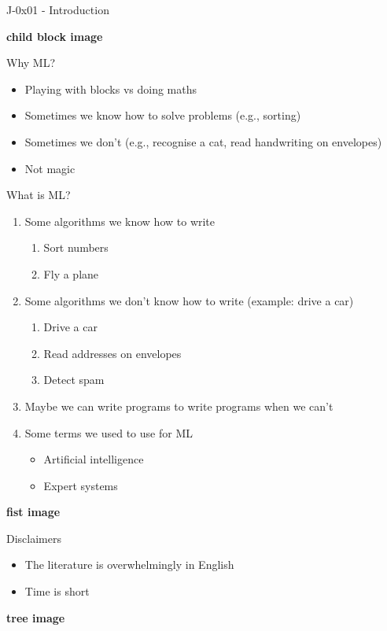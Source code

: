 \documentclass{article}
\begin{document}
\centerline{\Large J-0x01 - Introduction}
\vspace{5mm}

\textbf{child block image}

Why ML?
\begin{itemize}
\item Playing with blocks vs doing maths
\item Sometimes we know how to solve problems (e.g., sorting)
\item Sometimes we don't (e.g., recognise a cat, read handwriting on envelopes)
\item Not magic
\end{itemize}

What is ML?
\begin{enumerate}
\item Some algorithms we know how to write
  \begin{enumerate}
  \item Sort numbers
  \item Fly a plane
  \end{enumerate}
\item Some algorithms we don't know how to write (example: drive a car)
  \begin{enumerate}
  \item Drive a car 
  \item Read addresses on envelopes
  \item Detect spam
  \end{enumerate}
\item Maybe we can write programs to write programs when we can't
\item Some terms we used to use for ML
  \begin{itemize}
  \item Artificial intelligence
  \item Expert systems
  \end{itemize}
\end{enumerate}

\textbf{fist image}

Disclaimers
\begin{itemize}
\item The literature is overwhelmingly in English
\item Time is short
\end{itemize}

\textbf{tree image}
\end{document}
